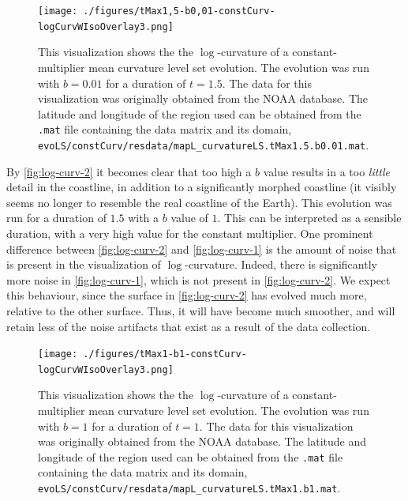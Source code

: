 \documentclass{article}
\begin{document}
\begin{figure}[h]
  \centering
  \texttt{[image: ./figures/tMax1,5-b0,01-constCurv-logCurvWIsoOverlay3.png]}
  \caption{This visualization shows the the $\log$-curvature of a
constant-multiplier mean curvature level set evolution. The
evolution was run with $b = 0.01$ for a duration of $t = 1.5$. The data
for this visualization was originally obtained from the NOAA
database. The latitude and longitude of the region used can be
obtained from the \texttt{.mat} file containing the data matrix
and its domain,
\texttt{evoLS/constCurv/resdata/mapL\_curvatureLS.tMax1.5.b0.01.mat}.}
\label{fig:log-curv-1}
\end{figure}

By \autoref{fig:log-curv-2} it becomes clear that too high a
$b$ value results in a too \emph{little} detail in the coastline,
in addition to a significantly morphed coastline (it visibly seems
no longer to resemble the real coastline of the Earth). This
evolution was run for a duration of $1.5$ with a $b$ value of
$1$. This can be interpreted as a sensible duration, with a very
high value for the constant multiplier. One prominent difference
between \autoref{fig:log-curv-2} and \autoref{fig:log-curv-1} is
the amount of noise that is present in the visualization of
$\log$-curvature. Indeed, there is significantly more noise in
\autoref{fig:log-curv-1}, which is not present in
\autoref{fig:log-curv-2}. We expect this behaviour, since the
surface in \autoref{fig:log-curv-2} has evolved much more,
relative to the other surface. Thus, it will have become much
smoother, and will retain less of the noise artifacts that exist
as a result of the data collection.

\begin{figure}[h]
  \centering
  \texttt{[image: ./figures/tMax1-b1-constCurv-logCurvWIsoOverlay3.png]}
  \caption{This visualization shows the the $\log$-curvature of a
constant-multiplier mean curvature level set evolution. The
evolution was run with $b = 1$ for a duration of $t = 1$. The data
for this visualization was originally obtained from the NOAA
database. The latitude and longitude of the region used can be
obtained from the \texttt{.mat} file containing the data matrix
and its domain,
\texttt{evoLS/constCurv/resdata/mapL\_curvatureLS.tMax1.b1.mat}.}
\label{fig:log-curv-2}
\end{figure}
\end{document}
